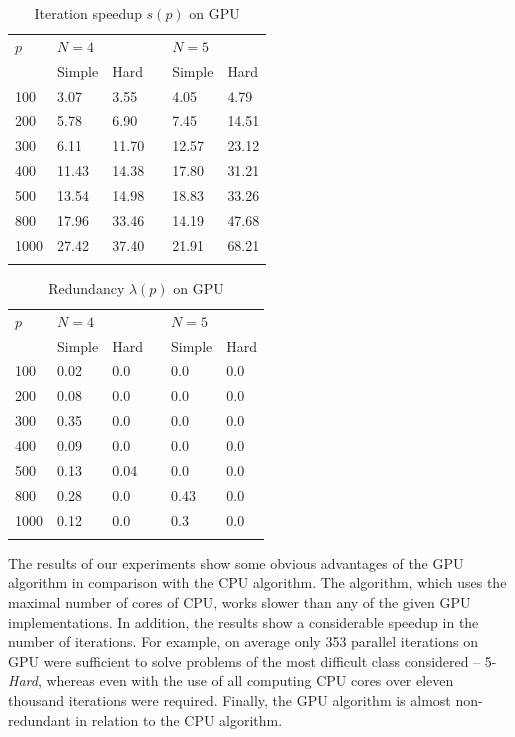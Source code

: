 \documentclass[smallcondensed]{svjour3}     %
\begin{document}
\begin{table}
	\caption{Iteration speedup $s(p)$ on GPU}
	\label{tab:last1}
	\center
	\begin{tabular}{llllll}
		\hline\noalign{\smallskip}
		$p$ & \multicolumn{2}{l}{ $N=4$ } & & \multicolumn{2}{l}{$N=5$} \\
		\noalign{\smallskip} \cline{2-3} \cline{5-6} \noalign{\smallskip}
		 & Simple & Hard & & Simple & Hard  \\
		\noalign{\smallskip} \hline \noalign{\smallskip}
		100	&	3.07	&	3.55	& &	4.05	&	4.79	\\
		200	&	5.78	&	6.90	& &	7.45	&	14.51	\\
		300	&	6.11	&	11.70	& &	12.57	&	23.12	\\
		400	&	11.43	&	14.38	& &	17.80	&	31.21	\\
		500	&	13.54	&	14.98	& &	18.83	&	33.26	\\
		800	&	17.96	&	33.46	& &	14.19	&	47.68	\\
		1000	&	27.42	&	37.40	& &	21.91	&	68.21	\\
		\noalign{\smallskip}\hline
	\end{tabular}
\end{table}


\begin{table}
	\caption{Redundancy $\lambda(p)$ on GPU}
	\label{tab:last}
	\center
	\begin{tabular}{llllll}
		\hline\noalign{\smallskip}
		$p$ & \multicolumn{2}{l}{ $N=4$ } & & \multicolumn{2}{l}{$N=5$} \\
		\noalign{\smallskip} \cline{2-3} \cline{5-6} \noalign{\smallskip}
		 & Simple & Hard & & Simple & Hard  \\
		\noalign{\smallskip} \hline \noalign{\smallskip}
		100 & 0.02 & 0.0 & & 0.0 & 0.0  \\
		200 & 0.08 & 0.0 & & 0.0 & 0.0  \\
		300 & 0.35 & 0.0 & & 0.0 & 0.0  \\
		400 & 0.09 & 0.0 & & 0.0 & 0.0  \\
		500 & 0.13 & 0.04 & & 0.0 & 0.0  \\
		800 & 0.28 & 0.0 & & 0.43 & 0.0  \\
		1000 & 0.12 & 0.0 & & 0.3 & 0.0  \\
		\noalign{\smallskip}\hline
	\end{tabular}
\end{table}

The results of our experiments show some obvious advantages of the GPU algorithm in comparison with the CPU algorithm. The algorithm, which uses the maximal number of cores of CPU, works slower than any of the given GPU implementations. In addition, the results show a considerable speedup in the number of iterations. For example, on average only 353 parallel iterations on GPU were sufficient to solve problems of the most difficult class considered -- 5-\textit{Hard}, whereas even with the use of all computing CPU cores over eleven thousand iterations were required. Finally, the GPU algorithm is almost non-redundant in relation to the CPU algorithm.
\end{document}
